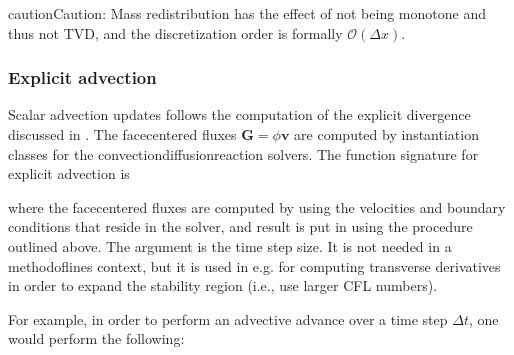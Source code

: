 \documentclass[letterpaper,10pt,english]{sphinxmanual}
\begin{document}
\begin{sphinxadmonition}{caution}{Caution:}
Mass redistribution has the effect of not being monotone and thus not TVD, and the discretization order is formally \(\mathcal{O}(\Delta x)\).
\end{sphinxadmonition}


\subsubsection{Explicit advection}
\label{\detokenize{Solvers/CDR:explicit-advection}}\label{\detokenize{Solvers/CDR:chap-explicitadvection}}
Scalar advection updates follows the computation of the explicit divergence discussed in {\hyperref[\detokenize{Solvers/CDR:chap-explicitdivergence}]{}}.
The face\sphinxhyphen{}centered fluxes \(\mathbf{G} = \phi\mathbf{v}\) are computed by instantiation classes for the convection\sphinxhyphen{}diffusion\sphinxhyphen{}reaction solvers.
The function signature for explicit advection is

\begin{sphinxVerbatim}[commandchars=\\\{\},formatcom=\scriptsize]
        
\end{sphinxVerbatim}

where the face\sphinxhyphen{}centered fluxes are computed by using the velocities and boundary conditions that reside in the solver, and result is put in  using the procedure outlined above.
The argument  is the time step size.
It is not needed in a method\sphinxhyphen{}of\sphinxhyphen{}lines context, but it is used in e.g.  for computing transverse derivatives in order to expand the stability region (i.e., use larger CFL numbers).

For example, in order to perform an advective advance over a time step \(\Delta t\), one would perform the following:
\end{document}
